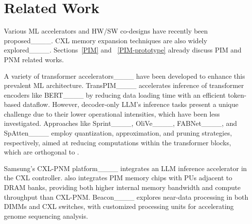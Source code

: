 \section{Related Work}
Various ML accelerators and HW/SW co-designs have recently been proposed____. CXL memory expansion techniques are also widely explored____. Sections~\ref{PIM} and ~\ref{PIM-prototype} already discuss PIM and PNM related works.

 A variety of transformer accelerators____ have been developed to enhance this prevalent ML architecture.
TransPIM____ accelerates inference of transformer encoders like BERT____ by reducing data loading time with an efficient token-based dataflow.
However, decoder-only LLM's inference tasks present a unique challenge due to their lower operational intensities, which have been less investigated. 
Approaches like Sprint____, OliVe____, FABNet____, and SpAtten____ employ quantization, approximation, and pruning strategies, respectively, aimed at reducing computations within the transformer blocks, which are orthogonal to \att{}.

  Samsung's CXL-PNM platform____ integrates an LLM inference accelerator in the CXL controller. \att{} also integrates PIM memory chips with PUs adjacent to DRAM banks, providing both higher internal memory bandwidth and compute throughput than CXL-PNM.
Beacon____ explores near-data processing in both DIMMs and CXL switches, with customized processing units for accelerating genome sequencing analysis.


